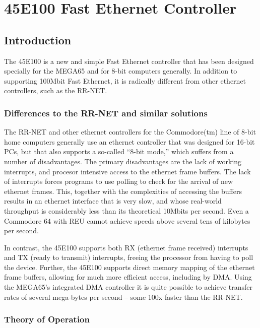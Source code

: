 \chapter{45E100 Fast Ethernet Controller}

\section{Introduction}

The 45E100 is a new and simple Fast Ethernet controller that has been
designed specially for the MEGA65 and for 8-bit computers generally.
In addition to supporting 100Mbit Fast Ethernet, it is radically
different from other ethernet controllers, such as the RR-NET.

\subsection{Differences to the RR-NET and similar solutions}

The RR-NET and other ethernet controllers for the Commodore(tm) line
of 8-bit home computers generally use an ethernet controller that was
designed for 16-bit PCs, but that also supports a so-called ``8-bit mode,''
which suffers from a number of disadvantages. The primary disadvantages
are the lack of working interrupts, and procesor intensive access to
the ethernet frame buffers.  The lack of interrupts forces programs to
use polling to check for the arrival of new ethernet frames.  This,
together with the complexities of accessing the buffers results in an
ethernet interface that is very slow, and whose real-world throughput
is considerably less than its theoretical 10Mbits per second.  Even
a Commodore 64 with REU cannot achieve speeds above several tens of
kilobytes per second.

In contrast, the 45E100 supports both RX (ethernet frame received) interrupts and TX
(ready to transmit) interrupts, freeing the processor from having to poll
the device.  Further, the 45E100 supports direct memory mapping of the
ethernet frame buffers, allowing for much more efficient access, including
by DMA.  Using the MEGA65's integrated DMA controller it is quite possible
to achieve transfer rates of several mega-bytes per second -- some 100x
faster than the RR-NET.

\subsection{Theory of Operation}

